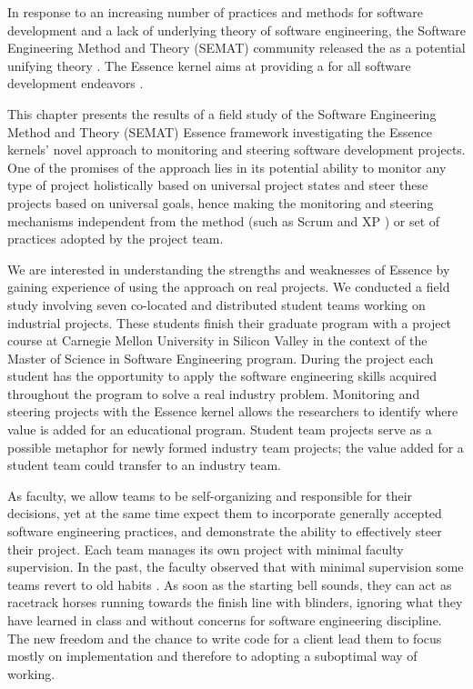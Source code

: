 In response to an increasing number of practices and methods for software development and a lack of underlying theory of software engineering, the Software Engineering Method and Theory (SEMAT) community released the  as a potential unifying theory \cite{OMGStandard}. The  Essence kernel aims at providing a  for all software development endeavors \cite{JacobsonQueue}.

This chapter presents the results of a field study of the Software Engineering Method and Theory (SEMAT) Essence framework \cite{SEMATKernel, EssenceBook} investigating the Essence kernels' novel approach to monitoring and steering software development projects. One of the promises of the approach lies in its potential ability to monitor any type of project holistically based on universal project states and steer these projects based on universal goals, hence making the monitoring and steering mechanisms independent from the method (such as Scrum \cite{AgileProjectManagement} and XP \cite{BeckExtremeProgramming2000}) or set of practices adopted by the project team.

We are interested in understanding the strengths and weaknesses of Essence by gaining experience of using the approach on real projects. We conducted a field study involving seven co-located and distributed student teams working on industrial projects. These students finish their graduate program with a project course at Carnegie Mellon University in Silicon Valley in the context of the Master of Science in Software Engineering program. During the project each student has the opportunity to apply the software engineering skills acquired throughout the program to solve a real industry problem. Monitoring and steering projects with the Essence kernel allows the researchers to identify where value is added for an educational program. Student team projects serve as a possible metaphor for newly formed industry team projects; the value added for a student team could transfer to an industry team.

As faculty, we allow teams to be self-organizing and responsible for their decisions, yet at the same time expect them to incorporate generally accepted software engineering practices, and demonstrate the ability to effectively steer their project. Each team manages its own project with minimal faculty supervision. In the past, the faculty observed that with minimal supervision some teams revert to old habits \cite{BareissTransferable}. As soon as the starting bell sounds, they can act as racetrack horses running towards the finish line with blinders, ignoring what they have learned in class and without concerns for software engineering discipline. The new freedom and the chance to write code for a client lead them to focus mostly on implementation and therefore to adopting a suboptimal way of working.


